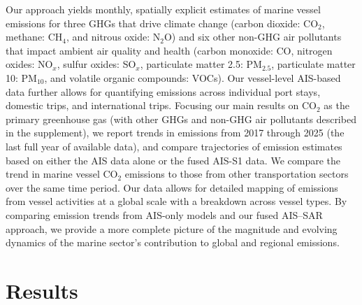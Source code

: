 \documentclass[lineno,pdflatex,sn-nature]{sn-jnl}
\begin{document}
Our approach yields monthly, spatially explicit estimates of marine vessel emissions for three GHGs that drive climate change (carbon dioxide: CO$_{2}$, methane: CH$_{4}$, and nitrous oxide: N$_{2}$O) and six other non-GHG air pollutants that impact ambient air quality and health (carbon monoxide: CO, nitrogen oxides: NO$_{x}$, sulfur oxides: SO$_{x}$, particulate matter 2.5: PM$_{2.5}$, particulate matter 10: PM$_{10}$, and volatile organic compounds: VOCs). Our vessel-level AIS-based data further allows for quantifying emissions across individual port stays, domestic trips, and international trips. Focusing our main results on CO$_{2}$ as the primary greenhouse gas (with other GHGs and non-GHG air pollutants described in the supplement), we report trends in emissions from 2017 through 2025 (the last full year of available data), and compare trajectories of emission estimates based on either the AIS data alone or the fused AIS-S1 data. We compare the trend in marine vessel CO$_{2}$ emissions to those from other transportation sectors over the same time period. Our data allows for detailed mapping of emissions from vessel activities at a global scale with a breakdown across vessel types. By comparing emission trends from AIS-only models and our fused AIS–SAR approach, we provide a more complete picture of the magnitude and evolving dynamics of the marine sector’s contribution to global and regional emissions.

\section{Results}
\end{document}
